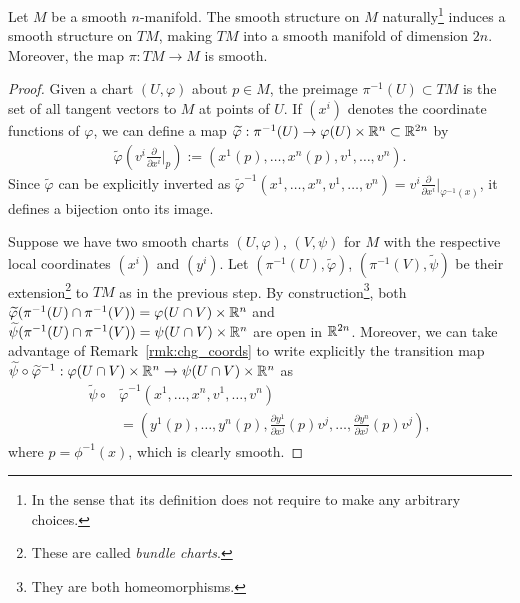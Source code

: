 \begin{theorem}\label{thm:tgbdlsmoothmfld}
  Let $M$ be a smooth $n$-manifold.
  The smooth structure on $M$ naturally\footnote{In the sense that its definition does not require to make any arbitrary choices.} induces a smooth structure on $TM$, making $TM$ into a smooth manifold of dimension $2n$.
  Moreover, the map $\pi: TM \to M$ is smooth.
\end{theorem}
\begin{proof}
  Given a chart $(U,\varphi)$ about $p\in M$, the preimage $\pi^{-1}(U) \subset TM$ is the set of all tangent vectors to $M$ at points of $U$.
  If $(x^i)$ denotes the coordinate functions of $\varphi$, we can define a map $\widetilde\varphi : \pi^{-1}(U) \to \varphi(U)\times\mathbb{R}^n \subset \mathbb{R}^{2n}$ by
  \begin{align}\label{eq:nat_coords}
    \widetilde\varphi\left(v^i \frac{\partial}{\partial x^i}\Big|_p\right) := \left(x^1(p), \ldots, x^n(p), v^1, \ldots, v^n\right).
  \end{align}
  Since $\widetilde\varphi$ can be explicitly inverted as $\widetilde\varphi^{-1}\left(x^1, \ldots, x^n, v^1, \ldots, v^n\right) = v^i \frac{\partial}{\partial x^i}\Big|_{\varphi^{-1}(x)}$, it defines a bijection onto its image.

  Suppose we have two smooth charts $(U,\varphi)$, $(V,\psi)$ for $M$ with the respective local coordinates $(x^i)$ and $(y^i)$.
  Let $(\pi^{-1}(U),\widetilde\varphi)$, $(\pi^{-1}(V),\widetilde\psi)$ be their extension\footnote{These are called \emph{bundle charts}.} to $TM$ as in the previous step.
  By construction\footnote{They are both homeomorphisms.}, both $\widetilde\varphi(\pi^{-1}(U)\cap\pi^{-1}(V)) = \varphi(U\cap V)\times\mathbb{R}^n$ and $\widetilde\psi(\pi^{-1}(U)\cap\pi^{-1}(V)) = \psi(U\cap V)\times\mathbb{R}^n$ are open in $\mathbb{R}^{2n}$.
  Moreover, we can take advantage of Remark~\ref{rmk:chg_coords} to write explicitly the transition map  $\widetilde\psi\circ\widetilde\varphi^{-1}: \varphi(U\cap V)\times\mathbb{R}^n \to \psi(U\cap V)\times\mathbb{R}^n$ as
  \begin{align}
    \widetilde\psi\circ & \widetilde\varphi^{-1}\left(x^1, \ldots, x^n, v^1, \ldots, v^n\right)                                                            \\
                        & =\left(y^1(p),\ldots, y^n(p), \frac{\partial y^1}{\partial x^j}(p) v^j, \ldots, \frac{\partial y^n}{\partial x^j}(p) v^j\right),
  \end{align}
  where $p = \phi^{-1}(x)$, which is clearly smooth.


\end{proof}
